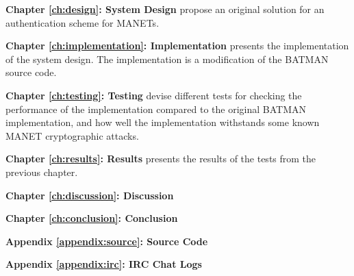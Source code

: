 \textbf{Chapter \ref{ch:design}: System Design} propose an original solution
for an authentication scheme for \acp{MANET}.

\textbf{Chapter \ref{ch:implementation}: Implementation} presents the
implementation of the system design. The implementation is a modification of the
\ac{BATMAN} source code.

\textbf{Chapter \ref{ch:testing}: Testing} devise different tests for checking
the performance of the implementation compared to the original \ac{BATMAN}
implementation, and how well the implementation withstands some known \ac{MANET}
cryptographic attacks.

\textbf{Chapter \ref{ch:results}: Results} presents the results of the tests
from the previous chapter.

\textbf{Chapter \ref{ch:discussion}: Discussion}

\textbf{Chapter \ref{ch:conclusion}: Conclusion}

\textbf{Appendix \ref{appendix:source}: Source Code}

\textbf{Appendix \ref{appendix:irc}: IRC Chat Logs}